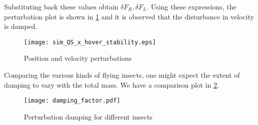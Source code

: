 \documentclass[10pt]{article}
\begin{document}
Substituting back these values obtain $ \delta F_R, \delta F_L $. Using these expressions, the perturbation plot is shown in \cref{fig:pos_vel_pert} and it is observed that the disturbance in velocity is damped.

\begin{figure}[h]
	\centering
	\texttt{[image: sim\_QS\_x\_hover\_stability.eps]}
	\caption{Position and velocity perturbations}
	\label{fig:pos_vel_pert}
\end{figure}

Comparing the various kinds of flying insects, one might expect the extent of damping to vary with the total mass. We have a comparison plot in \cref{fig:vel_damping}.

\begin{figure}[h]
	\centering
	\texttt{[image: damping\_factor.pdf]}
	\caption{Perturbation damping for different insects}
	\label{fig:vel_damping}
\end{figure}
\end{document}
